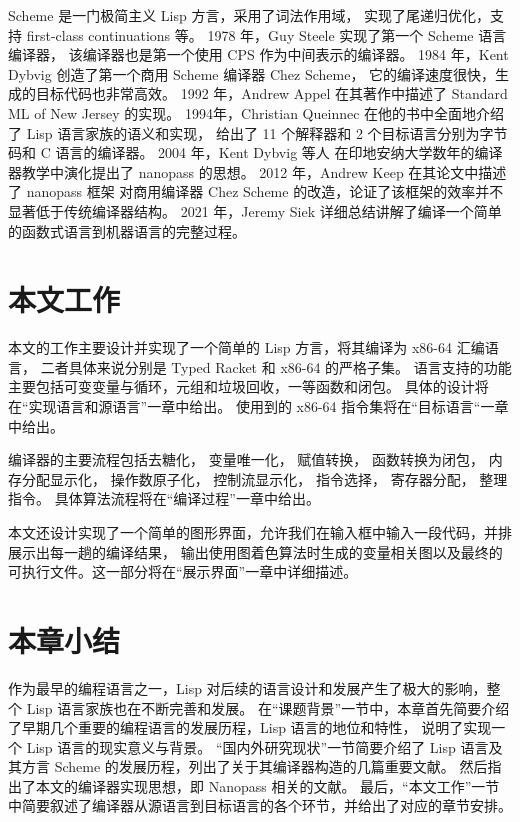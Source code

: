 Scheme 是一门极简主义 Lisp 方言，采用了词法作用域，
实现了尾递归优化，支持 first-class continuations 等。
1978 年，Guy Steele\cite{Steele_1978} 实现了第一个 Scheme 语言编译器，
该编译器也是第一个使用 CPS 作为中间表示的编译器。
1984 年，Kent Dybvig 创造了第一个商用 Scheme 编译器 Chez Scheme\cite{Dybvig_2006}，
它的编译速度很快，生成的目标代码也非常高效。
1992 年，Andrew Appel\cite{Appel_1992} 在其著作中描述了 Standard ML of New Jersey 的实现。
1994年，Christian Queinnec\cite{Queinnec_1996} 在他的书中全面地介绍了 Lisp 语言家族的语义和实现，
给出了 11 个解释器和 2 个目标语言分别为字节码和 C 语言的编译器。
2004 年，Kent Dybvig 等人\cite{Sarkar_Waddell_Dybvig_2004}
在印地安纳大学数年的编译器教学中演化提出了 nanopass 的思想。
2012 年，Andrew Keep\cite{Keep_Dybvig_2013} 在其论文中描述了 nanopass 框架
对商用编译器 Chez Scheme 的改造，论证了该框架的效率并不显著低于传统编译器结构。
2021 年，Jeremy Siek\cite{Siek_2022} 详细总结讲解了编译一个简单的函数式语言到机器语言的完整过程。

\section{本文工作}

本文的工作主要设计并实现了一个简单的 Lisp 方言，将其编译为 x86-64 汇编语言，
二者具体来说分别是 Typed Racket 和 x86-64 的严格子集。
语言支持的功能主要包括可变变量与循环，元组和垃圾回收，一等函数和闭包。
具体的设计将在“实现语言和源语言”一章中给出。
使用到的 x86-64 指令集将在“目标语言“一章中给出。

编译器的主要流程包括去糖化，
变量唯一化，
赋值转换，
函数转换为闭包，
内存分配显示化，
操作数原子化，
控制流显示化，
指令选择，
寄存器分配，
整理指令。
具体算法流程将在“编译过程”一章中给出。

本文还设计实现了一个简单的图形界面，允许我们在输入框中输入一段代码，并排展示出每一趟的编译结果，
输出使用图着色算法时生成的变量相关图以及最终的可执行文件。这一部分将在“展示界面”一章中详细描述。

\section{本章小结}

作为最早的编程语言之一，Lisp 对后续的语言设计和发展产生了极大的影响，整个 Lisp 语言家族也在不断完善和发展。
在“课题背景”一节中，本章首先简要介绍了早期几个重要的编程语言的发展历程，Lisp 语言的地位和特性，
说明了实现一个 Lisp 语言的现实意义与背景。
“国内外研究现状”一节简要介绍了 Lisp 语言及其方言 Scheme 的发展历程，列出了关于其编译器构造的几篇重要文献。
然后指出了本文的编译器实现思想，即 Nanopass 相关的文献。
最后，“本文工作”一节中简要叙述了编译器从源语言到目标语言的各个环节，并给出了对应的章节安排。
